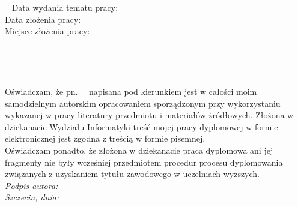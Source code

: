 \documentclass[12pt,fleqn,twoside]{book} %
\begin{document}
~\vfill
Data wydania tematu pracy: \datetitle \\
Data złożenia pracy: \datesubmit\\
Miejsce złożenia pracy: \placesubmit\\

\endgroup

\newpage
\thispagestyle{empty}
~\vfill

\newpage
\thispagestyle{empty}


\begin{center}\\[1cm] \end{center}

\noindent Oświadczam, że \degreename {\ }pn.{\ }{\emph \ttitle}{\ }
napisana pod kierunkiem \supname  {\ }
jest w całości moim samodzielnym autorskim opracowaniem sporządzonym przy wykorzystaniu wykazanej w pracy literatury przedmiotu i materiałów źródłowych. 
Złożona w dziekanacie Wydziału Informatyki
treść  mojej pracy dyplomowej w formie elektronicznej jest zgodna z treścią w formie pisemnej.\\[.2cm]

\noindent Oświadczam ponadto, że złożona w dziekanacie praca dyplomowa ani jej fragmenty nie były wcześniej przedmiotem procedur procesu dyplomowania związanych z uzyskaniem tytułu zawodowego w uczelniach wyższych.\\[2cm]

\noindent \textit{Podpis autora:}\\[2cm] %


\noindent \textit{Szczecin, dnia:} %

\newpage
\end{document}
